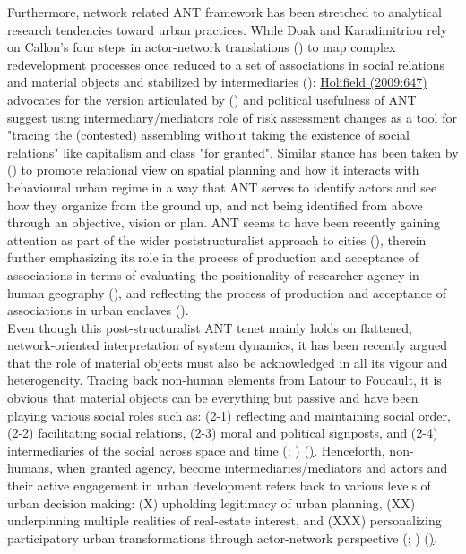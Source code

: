 \documentclass[11pt]{report}
\begin{document}
Furthermore, network related ANT framework has been stretched to analytical research tendencies toward urban practices. While Doak and Karadimitriou rely on Callon’s four steps in actor-network translations  (\href{Callon}{\citealt{callon_elements_1986}}) to map complex redevelopment processes once reduced to a set of associations in social relations and material objects and stabilized by intermediaries (\href{Doak}{\citealt{doak_re_2007}}); \href{Holifield}{Holifield (2009:647)}  advocates for the version articulated by (\href{Latour}{\citealt{latour_actor-network_1996}}) and political usefulness of ANT suggest using  intermediary/mediators role of risk assessment changes as a tool for "tracing the (contested) assembling without taking the existence of social relations" like capitalism and class "for granted". Similar stance has been taken by (\href{Boelens}{\citealt{boelens_theorizing_2010}}) to promote relational view on spatial planning and how it interacts with behavioural urban regime in a way that ANT serves to identify actors and see how they organize from the ground up, and not being identified from above through an objective, vision or plan. ANT seems to have been recently gaining attention as part of the wider poststructuralist approach to cities  (\href{Smith}{\citealt{smith_ordinary_2013}}), therein further emphasizing its role in the process of production and acceptance of associations in terms of evaluating the positionality of researcher agency in human geography (\href{Ruming}{\citealt{ruming_following_2009}}), and  reflecting the process of production and acceptance of associations in urban enclaves (\href{Wissink}{\citealt{wissink_enclave_2013}}).
\\

Even though this post-structuralist ANT tenet mainly holds on flattened, network-oriented interpretation of system dynamics, it has been recently argued that the role of material objects must also be acknowledged in all its vigour and heterogeneity. Tracing back non-human elements from Latour to Foucault, it is obvious that material objects can be everything but passive and have been playing various social roles such as: (2-1) reflecting and maintaining social order, (2-2) facilitating social relations, (2-3) moral and political signposts, and (2-4) intermediaries of the social across space and time (\href{Sayes}{\citealt{sayes_actor-network_2014}}; \href{Van Assche}{\citealt{van_assche_power_2014}}) (\href{Table 1}). Henceforth, non-humans, when granted agency, become intermediaries/mediators and actors and their active engagement in urban development refers back to various levels of urban decision making: (X) upholding legitimacy of urban planning, (XX) underpinning multiple realities of real-estate interest, and (XXX) personalizing participatory urban transformations through actor-network perspective (\href{Latour}{\citealt{latour_actor-network_1996}}; \href{Rydin}{\citealt{rydin_actor-network_2010}} \href{Van Assche}{\citealt{van_assche_power_2014}}) (\href{Table 1}).
\\
\end{document}
